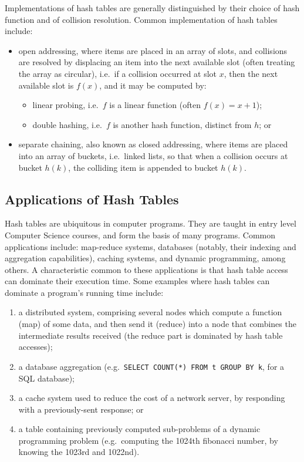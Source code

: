Implementations of hash tables are generally distinguished by their choice of hash function and of collision resolution.
Common implementation of hash tables include:
\begin{itemize}
    \item open addressing, where items are placed in an array of slots, and collisions are resolved by displacing an item into the next available slot (often treating the array as circular), i.e.\ if a collision occurred at slot $x$, then the next available slot is $f(x)$, and it may be computed by:
    \begin{itemize}
        \item linear probing, i.e.\ $f$ is a linear function (often $f(x) = x + 1$);
        \item double hashing, i.e.\ $f$ is another hash function, distinct from $h$; or
    \end{itemize}
    \item separate chaining, also known as closed addressing, where items are placed into an array of buckets, i.e.\ linked lists, so that when a collision occurs at bucket $h(k)$, the colliding item is appended to bucket $h(k)$.
\end{itemize}

\subsection{Applications of Hash Tables}\label{subsec:applications-of-hash-tables}

Hash tables are ubiquitous in computer programs.
They are taught in entry level Computer Science courses, and form the basis of many programs.
Common applications include: map-reduce systems, databases (notably, their indexing and aggregation capabilities), caching systems, and dynamic programming, among others.
A characteristic common to these applications is that hash table access can dominate their execution time.
Some examples where hash tables can dominate a program's running time include:
\begin{enumerate}
    \item a distributed system, comprising several nodes which compute a function (map) of some data, and then send it (reduce) into a node that combines the intermediate results received (the reduce part is dominated by hash table accesses);
    \item a database aggregation (e.g.\ \texttt{{SELECT COUNT(*) FROM t GROUP BY k}}, for a SQL database);
    \item a cache system used to reduce the cost of a network server, by responding with a previously-sent response; or
    \item a table containing previously computed sub-problems of a dynamic programming problem (e.g.\ computing the 1024th fibonacci number, by knowing the 1023rd and 1022nd).
\end{enumerate}

